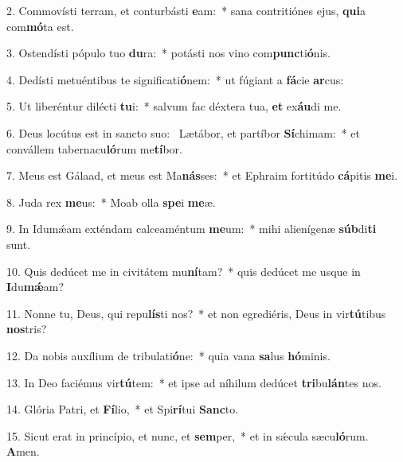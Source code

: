 2. Commovísti terram, et conturbásti \textbf{e}am:~*  sana contritiónes ejus, \textbf{qui}a com\textbf{mó}ta est.\

3. Ostendísti pópulo tuo \textbf{du}ra:~*  potásti nos vino com\textbf{punc}ti\textbf{ó}nis.\

4. Dedísti metuéntibus te significati\textbf{ó}nem:~*  ut fúgiant a \textbf{fá}cie \textbf{ar}cus:\

5. Ut liberéntur dilécti \textbf{tu}i:~*  salvum fac déxtera tua, \textbf{et} ex\textbf{áu}di me.\

6. Deus locútus est in sancto suo: \dag\  Lætábor, et partíbor \textbf{Sí}chimam:~*  et convállem tabernacu\textbf{ló}rum me\textbf{tí}bor.\

7. Meus est Gálaad, et meus est Ma\textbf{nás}ses:~*  et Ephraim fortitúdo \textbf{cá}pitis \textbf{me}i.\

8. Juda rex \textbf{me}us:~*  Moab olla \textbf{spe}i \textbf{me}æ.\

9. In Idumǽam exténdam calceaméntum \textbf{me}um:~*  mihi alienígenæ \textbf{súb}di\textbf{ti} sunt.\

10. Quis dedúcet me in civitátem mu\textbf{ní}tam?~*  quis dedúcet me usque in \textbf{I}du\textbf{mǽ}am?\

11. Nonne tu, Deus, qui repu\textbf{lís}ti nos?~*  et non egrediéris, Deus in vir\textbf{tú}tibus \textbf{nos}tris?\

12. Da nobis auxílium de tribulati\textbf{ó}ne:~*  quia vana \textbf{sa}lus \textbf{hó}minis.\

13. In Deo faciémus vir\textbf{tú}tem:~*  et ipse ad níhilum dedúcet \textbf{tri}bu\textbf{lán}tes nos.\

14. Glória Patri, et \textbf{Fí}lio,~*  et Spi\textbf{rí}tui \textbf{Sanc}to.\

15. Sicut erat in princípio, et nunc, et \textbf{sem}per,~*  et in sǽcula sæcu\textbf{ló}rum. \textbf{A}men.\

